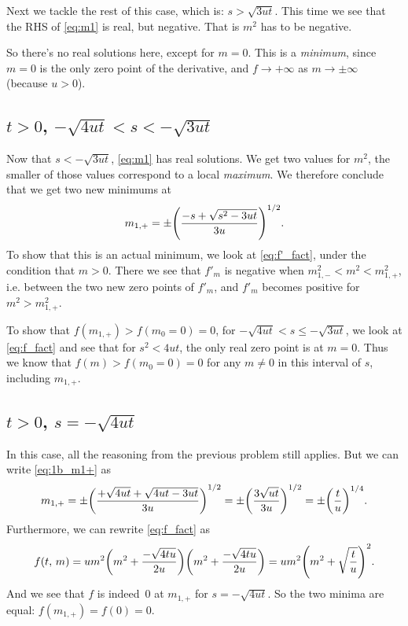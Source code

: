 \documentclass[11pt,letter, swedish, english
]{article}
\begin{document}
Next we tackle the rest of this case, which is: $s>\sqrt{3ut}$. This
time we see that the RHS of \eqref{eq:m1} is real, but negative. That
is $m^2$ has to be negative. 

So there's no real solutions here, except for $m=0$. This is a
\emph{minimum}, since $m=0$ is the only zero point of the derivative, and
$f\to+\infty$ as $m\to\pm\infty$ (because $u>0$).

\subsection{$t>0$, $-\sqrt{4ut}<s<-\sqrt{3ut}$}
Now that $s<-\sqrt{3ut}$, \eqref{eq:m1} has real solutions. We get
two values for $m^2$, the smaller of those values correspond to a
local \emph{maximum}. We therefore conclude that we get two new
minimums at
\begin{equation}\label{eq:1b_m1+}
m_{1,+}=\pm\qty(\frac{-s+\sqrt{s^2-3ut}}{3u})^{1/2}.
\end{equation}
To show that this is an actual minimum, we look at
\eqref{eq:f'_fact}, under the condition that
$m>0$\footnotemark{}. There we see that $f'_m$ is negative when 
$m_{1,-}^2<m^2<m_{1,+}^2$, i.e. between the two new zero points of
$f'_m$, and $f'_m$ becomes positive for $m^2>m_{1,+}^2$.

To show that $f(m_{1,+})>f(m_0=0)=0$, for $-\sqrt{4ut}<s\le-\sqrt{3ut}$,
we look at \eqref{eq:f_fact} and see that for $s^2<4ut$, the only real
zero point is at $m=0$. Thus we know that $f(m)>f(m_0=0)=0$ for any
$m\neq0$ in this interval of $s$, including $m_{1,+}$.
  
\subsection{$t>0$, $s=-\sqrt{4ut}$}
In this case, all the reasoning from the previous problem still
applies. But we can write \eqref{eq:1b_m1+} as
\begin{equation}
m_{1,+}=\pm\qty(\frac{+\sqrt{4ut}+\sqrt{4ut-3ut}}{3u})^{1/2}
=\pm\qty(\frac{3\sqrt{ut}}{3u})^{1/2}
=\pm\qty(\frac{t}{u})^{1/4}.
\end{equation}
Furthermore, we can rewrite \eqref{eq:f_fact} as
\begin{equation}
f(t,\,m)=um^2
\qty(m^2+\frac{-\sqrt{4tu}}{2u})
\qty(m^2+\frac{-\sqrt{4tu}}{2u})
=um^2\qty(m^2+\sqrt{\frac{t}{u}})^2.
\end{equation}
And we see that $f$ is indeed~0 at $m_{1,+}$ for $s=-\sqrt{4ut}$. So
the two minima are equal: $f(m_{1,+})=f(0)=0$. 
\end{document}
